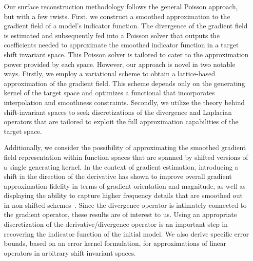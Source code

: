 Our surface reconstruction methodology follows the general Poisson approach, but with a few twists. First, we construct a smoothed approximation to the gradient field of a model's indicator function. The divergence of the gradient field is estimated and subsequently fed into a Poisson solver that outputs the coefficients needed to approximate the smoothed indicator function in a target shift invariant space. This Poisson solver is tailored to cater to the approximation power provided by each space. However, our approach is novel in two notable ways. Firstly, we employ a variational scheme to obtain a lattice-based approximation of the gradient field. This scheme depends only on the generating kernel of the target space and optimizes a functional that incorporates interpolation and smoothness constraints. Secondly, we utilize the theory behind shift-invariant spaces to seek discretizations of the divergence and Laplacian operators that are tailored to exploit the full approximation capabilities of the target space.

Additionally, we consider the possibility of approximating the smoothed gradient field representation within function spaces that are
spanned by shifted versions of a single generating kernel. In the context of gradient estimation, introducing a shift in the direction
of the derivative has shown to improve overall gradient approximation fidelity in terms of gradient orientation and magnitude,
as well as displaying the ability to capture higher frequency details that are smoothed out in non-shifted schemes~\cite{gradrev}. Since the divergence operator is intimately connected to the gradient operator, these results are of interest to us. Using an appropriate discretization of the derivative/divergence operator is an important step in recovering the indicator function of the initial model. We also derive specific error bounds, based on an error kernel formulation, for approximations of linear operators in arbitrary shift invariant spaces.

